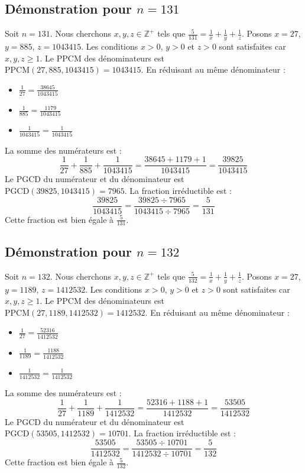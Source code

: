 \documentclass[11pt,a4paper]{article}
\begin{document}
\subsection{Démonstration pour $n = 131$}
Soit $n = 131$. Nous cherchons $x, y, z \in \mathbb{Z}^{+}$ tels que $\frac{5}{131} = \frac{1}{x} + \frac{1}{y} + \frac{1}{z}$.
Posons $x = 27$, $y = 885$, $z = 1043415$.
Les conditions $x > 0$, $y > 0$ et $z > 0$ sont satisfaites car $x, y, z \geq 1$.
Le PPCM des dénominateurs est $\text{PPCM}(27, 885, 1043415) = 1043415$.
En réduisant au même dénominateur :
\begin{itemize}
    \item $\frac{1}{27} = \frac{38645}{1043415}$
    \item $\frac{1}{885} = \frac{1179}{1043415}$
    \item $\frac{1}{1043415} = \frac{1}{1043415}$
\end{itemize}
La somme des numérateurs est :
$$ \frac{1}{27} + \frac{1}{885} + \frac{1}{1043415} = \frac{38645 + 1179 + 1}{1043415} = \frac{39825}{1043415} $$
Le PGCD du numérateur et du dénominateur est $\text{PGCD}(39825, 1043415) = 7965$.
La fraction irréductible est :
$$ \frac{39825}{1043415} = \frac{39825 \div 7965}{1043415 \div 7965} = \frac{5}{131} $$
Cette fraction est bien égale à $\frac{5}{131}$.

\subsection{Démonstration pour $n = 132$}
Soit $n = 132$. Nous cherchons $x, y, z \in \mathbb{Z}^{+}$ tels que $\frac{5}{132} = \frac{1}{x} + \frac{1}{y} + \frac{1}{z}$.
Posons $x = 27$, $y = 1189$, $z = 1412532$.
Les conditions $x > 0$, $y > 0$ et $z > 0$ sont satisfaites car $x, y, z \geq 1$.
Le PPCM des dénominateurs est $\text{PPCM}(27, 1189, 1412532) = 1412532$.
En réduisant au même dénominateur :
\begin{itemize}
    \item $\frac{1}{27} = \frac{52316}{1412532}$
    \item $\frac{1}{1189} = \frac{1188}{1412532}$
    \item $\frac{1}{1412532} = \frac{1}{1412532}$
\end{itemize}
La somme des numérateurs est :
$$ \frac{1}{27} + \frac{1}{1189} + \frac{1}{1412532} = \frac{52316 + 1188 + 1}{1412532} = \frac{53505}{1412532} $$
Le PGCD du numérateur et du dénominateur est $\text{PGCD}(53505, 1412532) = 10701$.
La fraction irréductible est :
$$ \frac{53505}{1412532} = \frac{53505 \div 10701}{1412532 \div 10701} = \frac{5}{132} $$
Cette fraction est bien égale à $\frac{5}{132}$.
\end{document}
